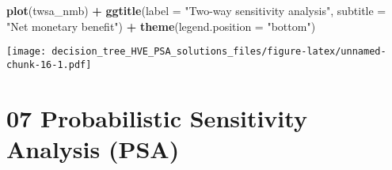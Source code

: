 \documentclass[
]{article}
\newenvironment{Shaded}{\begin{snugshade}}{\end{snugshade}}
\newcommand{\DataTypeTok}[1]{\textcolor[rgb]{0.13,0.29,0.53}{#1}}
\newcommand{\KeywordTok}[1]{\textcolor[rgb]{0.13,0.29,0.53}{\textbf{#1}}}
\newcommand{\NormalTok}[1]{#1}
\newcommand{\OperatorTok}[1]{\textcolor[rgb]{0.81,0.36,0.00}{\textbf{#1}}}
\newcommand{\StringTok}[1]{\textcolor[rgb]{0.31,0.60,0.02}{#1}}
\begin{document}
\begin{Shaded}
\begin{Highlighting}[]
\KeywordTok{plot}\NormalTok{(twsa_nmb) }\OperatorTok{+}\StringTok{ }
\StringTok{  }\KeywordTok{ggtitle}\NormalTok{(}\DataTypeTok{label =} \StringTok{"Two-way sensitivity analysis"}\NormalTok{, }
          \DataTypeTok{subtitle =} \StringTok{"Net monetary benefit"}\NormalTok{) }\OperatorTok{+}
\StringTok{          }\KeywordTok{theme}\NormalTok{(}\DataTypeTok{legend.position =} \StringTok{"bottom"}\NormalTok{)}
\end{Highlighting}
\end{Shaded}

\texttt{[image: decision\_tree\_HVE\_PSA\_solutions\_files/figure-latex/unnamed-chunk-16-1.pdf]}

\hypertarget{probabilistic-sensitivity-analysis-psa}{%
\section{07 Probabilistic Sensitivity Analysis
(PSA)}\label{probabilistic-sensitivity-analysis-psa}}
\end{document}
